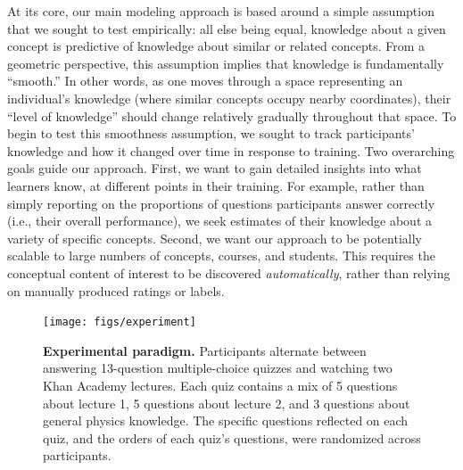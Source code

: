 \documentclass[10pt]{article}
\begin{document}
At its core, our main modeling approach is based around a simple assumption
that we sought to test empirically: all else being equal, knowledge about a
given concept is predictive of knowledge about similar or related concepts.
From a geometric perspective, this assumption implies that knowledge is
fundamentally ``smooth.'' In other words, as one moves through a space
representing an individual's knowledge (where similar concepts occupy nearby
coordinates), their ``level of knowledge'' should change relatively gradually
throughout that space. To begin to test this smoothness assumption, we sought
to track participants' knowledge and how it changed over time in response to
training. Two overarching goals guide our approach. First, we want to gain
detailed insights into what learners know, at different points in their
training. For example, rather than simply reporting on the proportions of
questions participants answer correctly (i.e., their overall performance), we
seek estimates of their knowledge about a variety of specific concepts.
Second, we want our approach to be potentially scalable to large numbers of
concepts, courses, and students. This requires the conceptual content of
interest to be discovered \textit{automatically}, rather than relying on
manually produced ratings or labels.

\begin{figure}[tp]
    \centering
    \texttt{[image: figs/experiment]}

    \caption{\textbf{Experimental paradigm.} Participants alternate between
    answering 13-question multiple-choice quizzes and watching two Khan Academy
    lectures. Each quiz contains a mix of 5 questions about lecture 1, 5
    questions about lecture 2, and 3 questions about general physics knowledge. The
    specific questions reflected on each quiz, and the orders of each quiz's
    questions, were randomized across participants.}

    \label{fig:experiment}
\end{figure}
\end{document}
